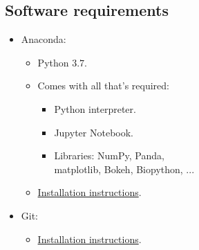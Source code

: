 \documentclass[aspectratio=1610,slidestop]{beamer}
\newcommand{\hrefc}[3]{\textcolor{#1}{\href{#2}{#3}}}
\begin{document}
\subsection{Software requirements}
\begin{pframe}
 \begin{itemize}
  \item Anaconda:
  \begin{itemize}
   \item Python $3.7$.
   \item Comes with all that's required:
   \begin{itemize}
    \item Python interpreter.
    \item Jupyter Notebook.
    \item Libraries: NumPy, Panda,\\
    matplotlib, Bokeh, Biopython, ...
   \end{itemize}
   \item \hrefc{emailc}{http://docs.anaconda.com/anaconda/install/}{Installation instructions}.
  \end{itemize}
  \bigskip
  \item Git:
  \begin{itemize}
   \item \hrefc{emailc}{https://git-scm.com/book/en/v2/Getting-Started-Installing-Git}{Installation instructions}.
  \end{itemize}
 \end{itemize}
\end{pframe}
\end{document}
